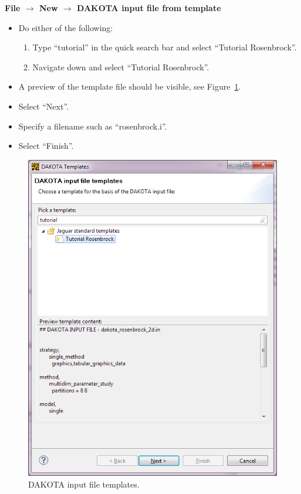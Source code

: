 {\bf File $\rightarrow$ New $\rightarrow$ DAKOTA input file from template}
\begin{itemize}
\item Do either of the following:
\begin{enumerate}
\item Type ``tutorial'' in the quick search bar and select ``Tutorial
  Rosenbrock''.
\item Navigate down and select ``Tutorial Rosenbrock''.
\end{enumerate}
\item A preview of the template file should be visible, see
  Figure~\ref{fig:input:1tutorial}.
\item Select ``Next''.
\item Specify a filename such as ``rosenbrock.i''.
\item Select ``Finish''.
\end{itemize}
\begin{figure}[htbp]
  \centering
  \includegraphics[scale=0.6]{images/1tutorial}
  \caption{DAKOTA input file templates.}
  \label{fig:input:1tutorial}
\end{figure}


